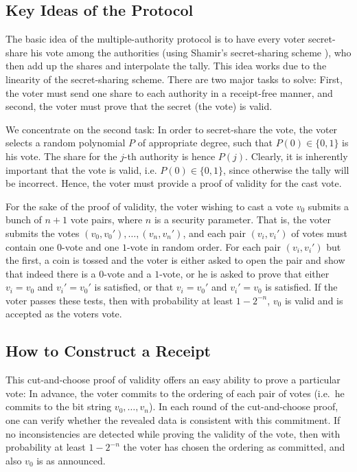 \documentclass{article}
\begin{document}
\subsection{Key Ideas of the Protocol}

The basic idea of the multiple-authority protocol \cite{BT94} is to have
every voter secret-share his vote among the authorities (using Shamir's
secret-sharing scheme \cite{Sha79}), who then add up the shares and
interpolate the tally. This idea works due to the linearity of the
secret-sharing scheme. There are two major tasks to solve: First, the
voter must send one share to each authority in a receipt-free manner,
and second, the voter must prove that the secret (the vote) is valid.

We concentrate on the second task: In order to secret-share the vote,
the voter selects a random polynomial $P$ of appropriate degree, such
that $P(0)\in\{0,1\}$ is his vote. The share for the $j$-th authority is
hence $P(j)$. Clearly, it is inherently important that the vote is
valid, i.e. $P(0)\in\{0,1\}$, since otherwise the tally will be
incorrect. Hence, the voter must provide a proof of validity for the
cast vote.

For the sake of the proof of validity, the voter wishing to cast a vote
$v_0$ submits a bunch of $n+1$ vote pairs, where $n$ is a security
parameter. That is, the voter submits the votes $(v_0,v_0'), \ldots,
(v_n,v_n')$, and each pair $(v_i,v_i')$ of votes must contain one $0$-vote
and one $1$-vote in random order.
For each pair $(v_i,v_i')$ but the first, a coin is tossed and the voter
is either asked to open the pair and show that indeed there is a
$0$-vote and a $1$-vote, or he is asked to prove that either $v_i=v_0$
and $v_i'=v_0'$ is satisfied, or that $v_i=v_0'$ and $v_i'=v_0$ is
satisfied. If the voter passes these tests, then with probability at
least $1-2^{-n}$, $v_0$ is valid and is accepted as the voters vote.

\subsection{How to Construct a Receipt}

This cut-and-choose proof of validity offers an easy ability to prove a
particular vote: In advance, the voter commits to the ordering of each
pair of votes (i.e.~he commits to the bit string $v_0,\ldots,v_n$). In
each round of the cut-and-choose proof, one can verify whether the
revealed data is consistent with this commitment. If no inconsistencies
are detected while proving the validity of the vote, then with
probability at least $1-2^{-n}$ the voter has chosen the ordering as
committed, and also $v_0$ is as announced.
\end{document}
